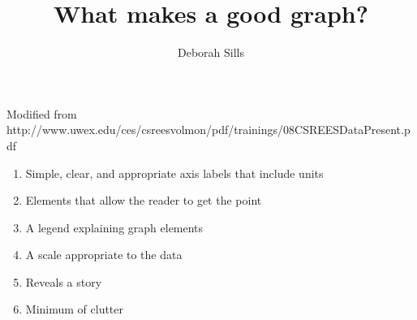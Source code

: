 \documentclass[12pt,letterpaper]{article}
\begin{document}
\setlength{\parindent}{0cm} 


\frenchspacing

\title {\textbf{What makes a good graph?}} 

\author {Deborah Sills}
\maketitle
Modified from http://www.uwex.edu/ces/csreesvolmon/pdf/trainings/08CSREESDataPresent.pdf
\begin{enumerate}

\item Simple, clear, and appropriate axis labels that include units
\item Elements that allow the reader to get the point
\item A legend explaining graph elements
\item A scale appropriate to the data
\item Reveals a story
\item Minimum of clutter
\end{enumerate}
\end{document}

